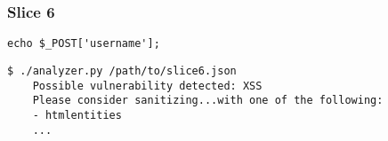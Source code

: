 \subsubsection*{Slice 6}
\label{sec:experimental.examples.slice06}

\begin{lstlisting}[label={php.slice06},
        title={slice6.php}]
    echo $_POST['username'];
\end{lstlisting}

\begin{lstlisting}[label={out.example.slice06},
        caption={Shortened example XSS vulnerable slice analysis output}]
    $ ./analyzer.py /path/to/slice6.json
    Possible vulnerability detected: XSS
    Please consider sanitizing...with one of the following:
    - htmlentities
    ...
\end{lstlisting}

